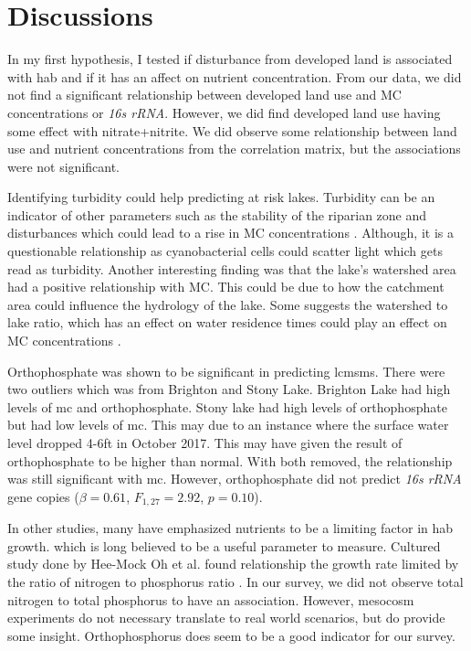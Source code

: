 \section{Discussions}

In my first hypothesis, I tested if disturbance from developed land is associated with \gls{hab} and if it has an affect on nutrient concentration.  From our data, we did not find a significant relationship between developed land use and MC concentrations or \emph{16s rRNA}. However, we did find developed land use having some effect with nitrate+nitrite. We did observe some relationship between land use and nutrient concentrations from the correlation matrix, but the associations were not significant.

Identifying turbidity could help predicting at risk lakes. Turbidity can be an indicator of other parameters such as the stability of the riparian zone and disturbances which could lead to a rise in MC concentrations \cite{taranu_predicting_2017}. Although, it is a questionable relationship as cyanobacterial cells could scatter light which gets read as turbidity. Another interesting finding was that the lake's watershed area had a positive relationship with MC. This could be due to how the catchment area could influence the hydrology of the lake. Some suggests the watershed to lake ratio, which has an effect on water residence times could play an effect on MC concentrations \cite{taranu_predicting_2017, fraterrigo_influence_2008}. 

Orthophosphate was shown to be significant in predicting \gls{lcmsms}. There were two outliers which was from Brighton and Stony Lake. Brighton Lake had high levels of \gls{mc} and orthophosphate. Stony lake had high levels of orthophosphate but had low levels of \gls{mc}. This may due to an instance where the surface water level dropped 4-6ft in October 2017. This may have given the result of orthophosphate to be higher than normal. With both removed, the relationship was still significant with \gls{mc}. However, orthophosphate did not predict \emph{16s rRNA} gene copies ($\beta=0.61$, $F_{{1,27}}=2.92$, $p=0.10$).

In other studies, many have emphasized nutrients to be a limiting factor in \gls{hab} growth.  which is long believed to be a useful parameter to measure. Cultured study done by Hee-Mock Oh et al. found relationship the growth rate limited by the ratio of nitrogen to phosphorus ratio \cite{oh_microcystin_2000}. In our survey, we did not observe total nitrogen to total phosphorus to have an association. However, mesocosm experiments do not necessary translate to real world scenarios, but do provide some insight. Orthophosphorus does seem to be a good indicator for our survey. 

